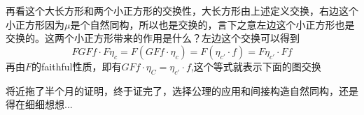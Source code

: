 \documentclass[UTF8,11pt,a4paper]{ctexart}
\begin{document}
再看这个大长方形和两个小正方形的交换性，大长方形由上述定义交换，右边这个小正方形因为$\mu$是个自然同构，所以也是交换的，言下之意左边这个小正方形也是交换的。这两个小正方形带来的作用是什么？左边这个交换可以得到\[FGFf \cdot F\eta_c = F(GFf \cdot \eta_c) = F(\eta_{c'} \cdot f) = F\eta_{c'} \cdot Ff\]再由$F$的faithful性质，即有$GFf \cdot \eta_C = \eta_{c'} \cdot f$,这个等式就表示下面的图交换

\begin{center}
\end{center}

将近拖了半个月的证明，终于证完了，选择公理的应用和间接构造自然同构，还是得在细细想想...
\end{document}
